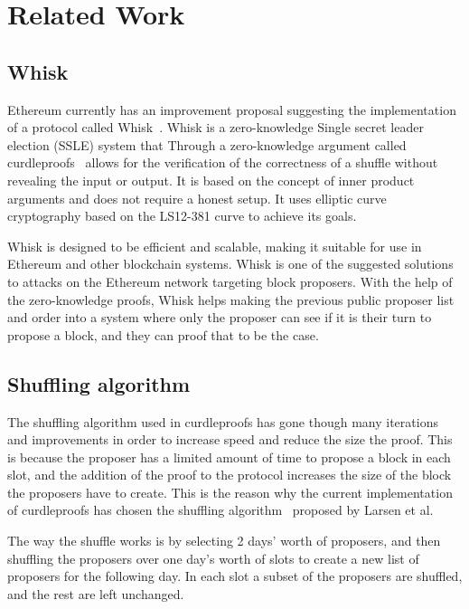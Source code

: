 \section{Related Work}\label{sec:related-work}




\subsection{Whisk}\label{sec:related-work-whisk}
Ethereum currently has an improvement proposal suggesting the implementation of a protocol called Whisk~\cite{Whisk2024}.
Whisk is a zero-knowledge Single secret leader election (SSLE) system that Through a zero-knowledge argument called curdleproofs~\cite{Curdleproofs} allows for the verification of the correctness of a shuffle without revealing the input or output.
It is based on the concept of inner product arguments and does not require a honest setup.
It uses elliptic curve cryptography based on the LS12-381 curve to achieve its goals.

Whisk is designed to be efficient and scalable, making it suitable for use in Ethereum and other blockchain systems.
Whisk is one of the suggested solutions to attacks on the Ethereum network targeting block proposers.
With the help of the zero-knowledge proofs, Whisk helps making the previous public proposer list and order into a system where only the proposer can see if it is their turn to propose a block, and they can proof that to be the case.



\subsection{Shuffling algorithm}\label{sec:related-work-Shuffling-algorithm}
The shuffling algorithm used in curdleproofs has gone though many iterations and improvements in order to increase speed and reduce the size the proof.
This is because the proposer has a limited amount of time to propose a block in each slot, and the addition of the proof to the protocol increases the size of the block the proposers have to create.
This is the reason why the current implementation of curdleproofs has chosen the shuffling algorithm~\cite{cryptoeprint:2022/560} proposed by Larsen et al.

The way the shuffle works is by selecting 2 days' worth of proposers, and then shuffling the proposers over one day's worth of slots to create a new list of proposers for the following day.
In each slot a subset of the proposers are shuffled, and the rest are left unchanged.

